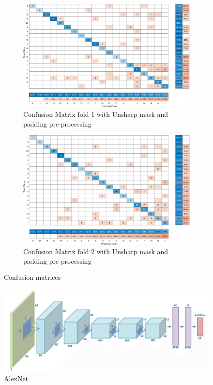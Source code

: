 \documentclass[letterpaper]{article} %
\begin{document}
\begin{figure}
    \begin{subfigure}{0.45\textwidth}
        \includegraphics[width=\textwidth,height=0.25\textheight]{FINAL_USH_n_PAD_fold1_acc_0.86490.pdf}
        \caption{Confusion Matrix fold 1 with Unsharp mask and padding pre-processing}
    \end{subfigure}
    \begin{subfigure}{0.45\textwidth}
        \includegraphics[width=\textwidth,height=0.25\textheight]{FINAL_USH_n_PAD_fold2_acc_0.83576.pdf}
        \caption{Confusion Matrix fold 2 with Unsharp mask and padding pre-processing}
    \end{subfigure}
    \caption{Confusion matrices}
    \label{fig:comparisonConfusionMatrix}
\end{figure}

\newpage

\begin{figure}
    \centering
    \includegraphics[width=\textwidth]{AlexNet_scheme.png}
    \caption{AlexNet}
    \label{fig:AlexNet}
\end{figure}
\end{document}
